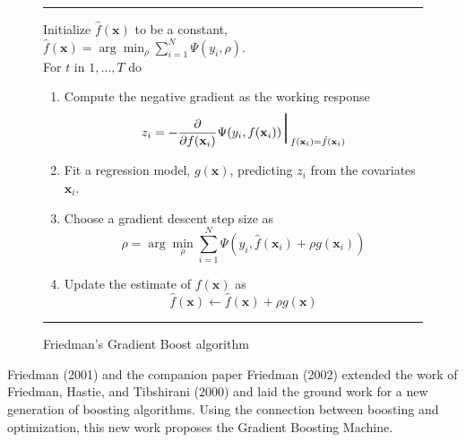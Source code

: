 \documentclass{article}
\newcommand{\aRule}{\begin{center} \rule{5in}{1mm} \end{center}}
\begin{document}
\begin{figure}
\aRule
Initialize $\hat f(\mathbf{x})$ to be a constant, $\hat f(\mathbf{x}) = \arg \min_{\rho} \sum_{i=1}^N \Psi(y_i,\rho)$. \\
For $t$ in $1,\ldots,T$ do
\begin{enumerate}
\item Compute the negative gradient as the working response
    \begin{equation}
    z_i = -\frac{\partial}{\partial f(\mathbf{x}_i)} \Psi(y_i,f(\mathbf{x}_i)) \mbox{\Huge $|$}_{f(\mathbf{x}_i)=\hat f(\mathbf{x}_i)}
    \end{equation}
\item Fit a regression model, $g(\mathbf{x})$, predicting $z_i$ from the covariates $\mathbf{x}_i$.
\item Choose a gradient descent step size as
    \begin{equation}
    \rho = \arg \min_{\rho} \sum_{i=1}^N \Psi(y_i,\hat f(\mathbf{x}_i)+\rho g(\mathbf{x}_i))
    \end{equation}
\item Update the estimate of $f(\mathbf{x})$ as
    \begin{equation}
    \hat f(\mathbf{x}) \leftarrow \hat f(\mathbf{x}) + \rho g(\mathbf{x})
    \end{equation}
\end{enumerate}
\aRule \caption{Friedman's Gradient Boost algorithm}
\label{fig:GradientBoost}
\end{figure}

Friedman (2001) and the companion paper Friedman (2002) extended the work of Friedman, Hastie, and Tibshirani (2000) and laid the ground work for a new generation of boosting algorithms. Using the connection between boosting and optimization, this new work proposes the Gradient Boosting Machine.
\end{document}
